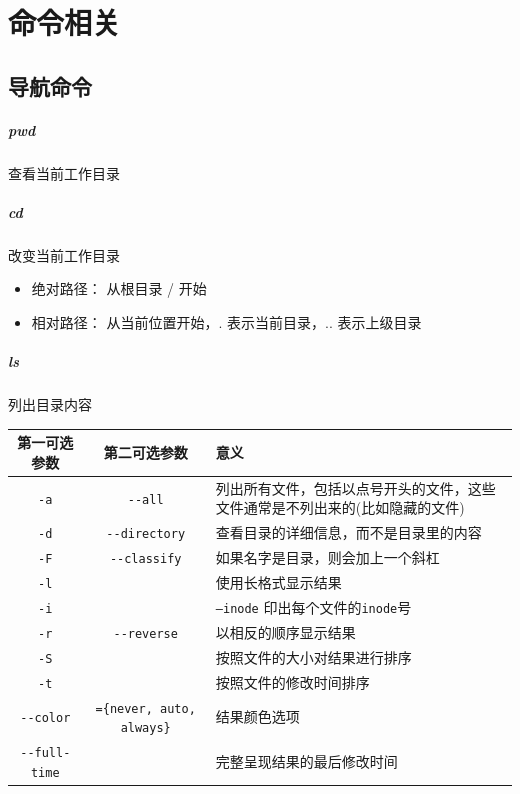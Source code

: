 \documentclass[UTF8,a4paper,12pt]{ctexbook}
\begin{document}
 \chapter{命令相关}
	 \section{导航命令}
		 \paragraph{pwd}查看当前工作目录
		 \paragraph{cd}改变当前工作目录
			 \begin{itemize}[itemindent = 1em]
			 	\item 绝对路径： 从根目录 / 开始
			 	\item 相对路径： 从当前位置开始，. 表示当前目录，.. 表示上级目录
			 \end{itemize}
		 \paragraph{ls}列出目录内容
			\begin{table}[H]
				\centering
				\caption{\textbf{ls }参数说明}
				\begin{longtable}{c|c|m{10cm}}
					\hline 
					第一可选参数 & 第二可选参数 & 意义\\
					\hline
					\verb|-a|  & \verb|--all| & 列出所有文件，包括以点号开头的文件，这些文件通常是不列出来的(比如隐藏的文件)\\
					\verb|-d|  & \verb|--directory| & 查看目录的详细信息，而不是目录里的内容\\
					\verb|-F|  & \verb|--classify|  & 如果名字是目录，则会加上一个斜杠\\
					\verb|-l|  & 			  & 使用长格式显示结果\\
					\verb|-i|  &			  & \verb|–inode| 印出每个文件的\verb|inode|号\\
					\verb|-r|  & \verb|--reverse|   & 以相反的顺序显示结果\\
					\verb|-S|  & 			  & 按照文件的大小对结果进行排序\\
					\verb|-t|  &			  & 按照文件的修改时间排序\\
					\verb|--color|  	& 	\verb|={never, auto, always}|			  & 结果颜色选项\\
					\verb|--full-time|  &	\verb| |		 						  & 完整呈现结果的最后修改时间 \\
					\hline
				\end{longtable}
			\end{table}
\end{document}
